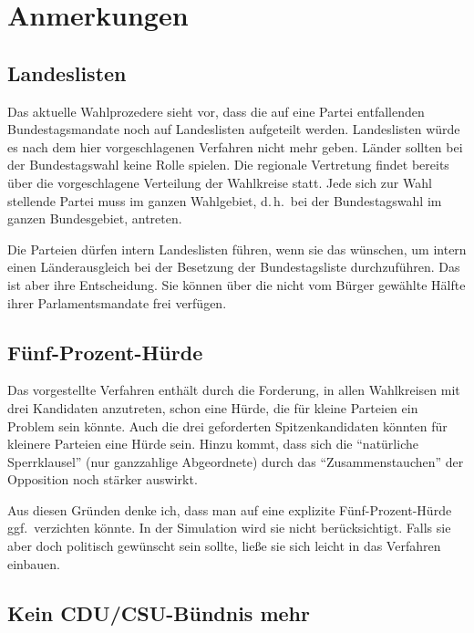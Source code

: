 \section{Anmerkungen}

\subsection{Landeslisten}

Das aktuelle Wahlprozedere sieht vor, dass die auf eine Partei entfallenden Bundestagsmandate
noch auf Landeslisten aufgeteilt werden. Landeslisten würde es nach dem hier vorgeschlagenen
Verfahren nicht mehr geben. Länder sollten bei der Bundestagswahl keine Rolle spielen. Die
regionale Vertretung findet bereits über die vorgeschlagene Verteilung der Wahlkreise statt.
Jede sich zur Wahl stellende Partei muss im ganzen Wahlgebiet, d.\,h.\ bei der Bundestagswahl im
ganzen Bundesgebiet, antreten.

Die Parteien dürfen intern Landeslisten führen, wenn sie das wünschen, um intern einen
Länderausgleich bei der Besetzung der Bundestagsliste durchzuführen. Das ist aber ihre
Entscheidung. Sie können über die nicht vom Bürger gewählte Hälfte ihrer Parlamentsmandate frei
verfügen.

\subsection{Fünf-Prozent-Hürde}

Das vorgestellte Verfahren enthält durch die Forderung, in allen Wahlkreisen mit drei Kandidaten
anzutreten, schon eine Hürde, die für kleine Parteien ein Problem sein könnte.
Auch die drei geforderten Spitzenkandidaten könnten für kleinere Parteien eine Hürde sein.
Hinzu kommt, dass sich die \enquote{natürliche Sperrklausel} (nur ganzzahlige Abgeordnete) durch das
\enquote{Zusammenstauchen} der Opposition noch stärker auswirkt.

Aus diesen Gründen denke ich, dass man auf eine explizite Fünf-Prozent-Hürde ggf.\ verzichten
könnte.
In der Simulation wird sie nicht berücksichtigt.
Falls sie aber doch politisch gewünscht
sein sollte, ließe sie sich leicht in das Verfahren einbauen.

\subsection{Kein CDU/CSU-Bündnis mehr}

